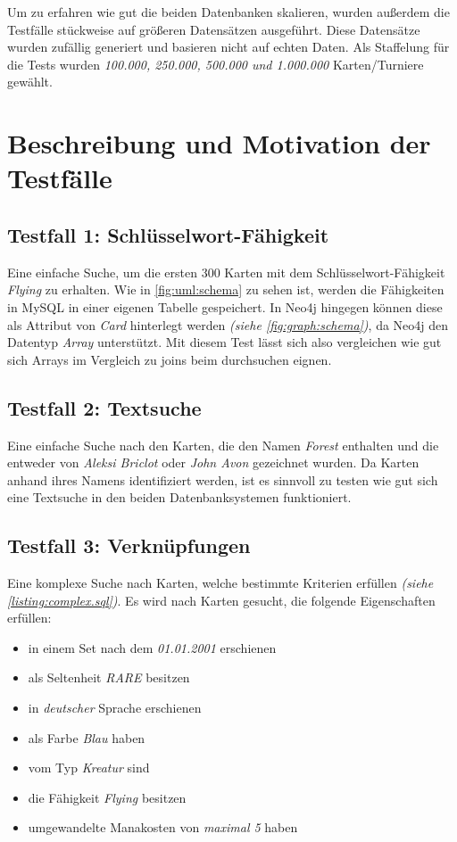 Um zu erfahren wie gut die beiden Datenbanken skalieren, wurden außerdem die Testfälle stückweise auf größeren Datensätzen ausgeführt. Diese Datensätze wurden zufällig generiert und basieren nicht auf echten Daten. Als Staffelung für die Tests wurden \emph{100.000, 250.000, 500.000 und 1.000.000} Karten/Turniere gewählt.

\section{Beschreibung und Motivation der Testfälle}

\subsection{Testfall 1: Schlüsselwort-Fähigkeit}
Eine einfache Suche, um die ersten 300 Karten mit dem Schlüsselwort-Fähigkeit \emph{Flying} zu erhalten. Wie in \autoref{fig:uml:schema} zu sehen ist, werden die Fähigkeiten in MySQL in einer eigenen Tabelle gespeichert. In Neo4j hingegen können diese als Attribut von \emph{Card} hinterlegt werden \emph{(siehe \autoref{fig:graph:schema})}, da Neo4j den Datentyp \emph{Array} unterstützt. Mit diesem Test lässt sich also vergleichen wie gut sich Arrays im Vergleich zu joins beim durchsuchen eignen.
    
\subsection{Testfall 2: Textsuche}
Eine einfache Suche nach den Karten, die den Namen \emph{Forest} enthalten und die entweder von \emph{Aleksi Briclot} oder \emph{John Avon} gezeichnet wurden. Da Karten anhand ihres Namens identifiziert werden, ist es sinnvoll zu testen wie gut sich eine Textsuche in den beiden Datenbanksystemen funktioniert.

\subsection{Testfall 3: Verknüpfungen}
Eine komplexe Suche nach Karten, welche bestimmte Kriterien erfüllen \emph{(siehe \ref{listing:complex.sql})}. Es wird nach Karten gesucht, die folgende Eigenschaften erfüllen:
\begin{itemize}
    \item in einem Set nach dem \emph{01.01.2001} erschienen
    \item als Seltenheit \emph{RARE} besitzen
    \item in \emph{deutscher} Sprache erschienen
    \item als Farbe \emph{Blau} haben
    \item vom Typ \emph{Kreatur} sind
    \item die Fähigkeit \emph{Flying} besitzen
    \item umgewandelte Manakosten von \emph{maximal 5} haben
 \end{itemize} 

